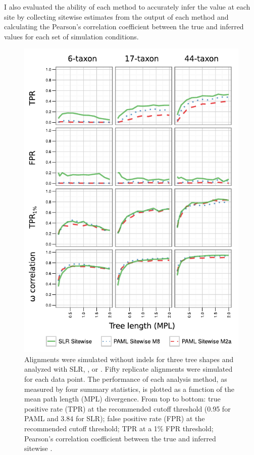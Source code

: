 I also evaluated the ability of each method to accurately infer the
\omg value at each site by collecting sitewise \omg estimates from
the output of each method and calculating the Pearson's correlation
coefficient between the true and inferred \omg values for each set
of simulation conditions.

\begin{figure}[t!]
\centering
\includegraphics[scale=1]{Figs/fig2.pdf}
\caption{Alignments were simulated without indels for three tree
  shapes and analyzed with SLR, \meight, or \mtwo. Fifty replicate
  alignments were simulated for each data point. The performance of
  each analysis method, as measured by four summary statistics, is
  plotted as a function of the mean path length (MPL) divergence. From
  top to bottom: true positive rate (TPR) at the recommended cutoff
  threshold (0.95 for PAML and 3.84 for SLR); false positive rate
  (FPR) at the recommended cutoff threshold; TPR at a 1\% FPR
  threshold; Pearson's correlation coefficient between the true and
  inferred sitewise \omg.}
\label{fig_2}
\end{figure}

